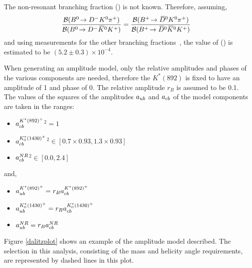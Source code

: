 The non-resonant branching fraction \BR(\decay{\Bp}{\Dzb\KS\pip}) is not known. Therefore, assuming,
\begin{equation*}
\frac{{\mathcal{B}}({{B}^0}\!\rightarrow {\ensuremath{{D}^-}}{\ensuremath{{K}^0}}{\ensuremath{{\pi}^+}})}{{\mathcal{B}}({{B}^0}\!\rightarrow {\ensuremath{{D}^-}}{\ensuremath{{\kern 0.2em\overline{\kern -0.2em K}{}}{}^0}}{\ensuremath{{K}^+}})} = \frac{{\mathcal{B}}({{{B}^+}}\!\rightarrow {\ensuremath{{\kern 0.2em\overline{\kern -0.2em D}{}}{}^0}}{\ensuremath{{K}^0}}{\ensuremath{{\pi}^+}})}{{\mathcal{B}}({{{B}^+}}\!\rightarrow {\ensuremath{{\kern 0.2em\overline{\kern -0.2em D}{}}{}^0}}{\ensuremath{{\kern 0.2em\overline{\kern -0.2em K}{}}{}^0}}{\ensuremath{{K}^+}})}
\end{equation*}
and using measurements for the other branching fractions~\cite{PDG2014}, the value of \BR(\decay{\Bp}{\Dzb\KS\pip}) is estimated to be $(5.2 \pm 0.3) \times 10^{-4}$.

When generating an amplitude model, only the relative amplitudes and phases of the various components are needed, therefore the $K^*(892)$ is fixed to have an amplitude of 1 and phase of 0. The relative amplitude $r_B$ is assumed to be 0.1. The values of the squares of the amplitudes $a_{{u}{b}}$ and $a_{{c}{b}}$ of the model components are taken in the ranges:

\begin{itemize}
\item \textbar $a_{{c}{b}}^{K^*(892)^+}$\textbar$^2 = 1$
\item \textbar $a_{{c}{b}}^{K^*_0(1430)^+}$\textbar$^2 \in [0.7 \times 0.93,1.3 \times 0.93]$
\item \textbar $a_{{c}{b}}^{NR}$\textbar$^2 \in [0.0,2.4]$
\end{itemize}

and,

\begin{itemize}
\item $a_{{u}{b}}^{K^*(892)^+} = r_B a_{{c}{b}}^{K^*(892)^+}$
\item $a_{{u}{b}}^{K^*_0(1430)^+} = r_B a_{{c}{b}}^{K^*_0(1430)^+}$
\item $a_{{u}{b}}^{NR} = r_B a_{{c}{b}}^{NR}$
\end{itemize}

Figure \ref{dalitzplot} shows an example of the amplitude model described. The \Kstar selection in this analysis, consisting of the \Kstar mass and \KS helicity angle requirements, are represented by dashed lines in this plot.

